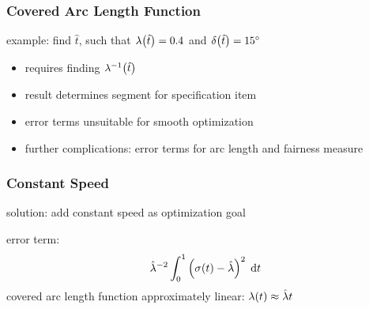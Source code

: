 \documentclass[mathserif]{beamer}
\begin{document}
		\begin{frame}
			\frametitle{Covered Arc Length Function}
			example: find \(\hat{t}\), such that \(\lambda\!\left( \hat{t} \right) = 0.4\) and \(\delta\!\left( \hat{t} \right) = 15^\circ\)
			\begin{itemize}
				\item requires finding \(\lambda^{-1}\!\left( \hat{t} \right)\)
				\item result determines segment for specification item
				\item error terms unsuitable for smooth optimization
				\item further complications: error terms for arc length and fairness measure
			\end{itemize}
		\end{frame}

		\begin{frame}
			\frametitle{Constant Speed}
			solution: add constant speed as optimization goal

			\bigskip

			error term:
			\begin{equation*}
				\hat{\lambda}^{-2}\int_{0}^{1} \left( \sigma\!\left( t \right) - \hat{\lambda} \right)^2 \; \mathrm{d}t
			\end{equation*}
			covered arc length function approximately linear: \(\lambda\!\left( t \right) \approx \hat{\lambda}t\)
		\end{frame}
\end{document}
